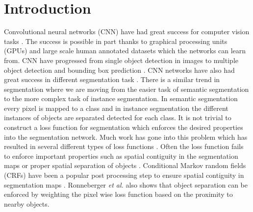 \documentclass{kththesis}
\begin{document}
\tableofcontents


\mainmatter


\chapter{Introduction}
Convolutional neural networks (CNN) have had great success for computer vision tasks \parencite{sermanet_overfeat:_2013,zeiler_visualizing_2013,  simonyan_two-stream_2014, krizhevsky_imagenet_2012}.
The success is possible in part thanks to graphical processing units (GPUs) and large scale human annotated datasets which  the networks can learn from. CNN have progressed from single object detection in images \parencite{krizhevsky_learning_2009} to multiple object detection and bounding box prediction \parencite{lin_microsoft_2014}. CNN networks have also had great success in different segmentation task \parencite{garcia-garcia_review_2017}. There is a similar trend in segmentation where we are moving from the easier task of semantic segmentation to the more complex task of instance segmentation. In semantic segmentation every pixel is mapped to a class and in instance segmentation the different instances of objects are separated detected for each class. It is not trivial to construct a loss function for segmentation which enforces the desired properties into the segmentation network. Much work has gone into this problem which has resulted in several different types of loss functions \parencite{ronneberger_u-net:_2015, yu_unitbox:_2016, rahman_optimizing_2016}. Often the loss function fails to enforce important properties such as spatial contiguity in the segmentation maps \parencite{luc_semantic_2016} or proper spatial separation of objects \parencite{audebert_segment-before-detect:_2017}. Conditional Markov random fields (CRFs) have been a popular post processing step to ensure spatial contiguity in segmentation maps \parencite{zhao_classification_2007}. Ronneberger \textit{et al.} \parencite{ronneberger_u-net:_2015} also shows that object separation can be enforced by weighting the pixel wise loss function based on the proximity to nearby objects.\\
\\
\end{document}
